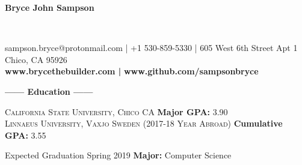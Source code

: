 \documentclass[12pt]{article}
\begin{document}
\sffamily
\lsstyle
\color{white}
\center
\begin{Huge}\textbf{Bryce John Sampson}\end{Huge}\\
\medskip
\fontsize{12}{1.2}
\selectfont
\smallbreak
\colorbox{accent}{
    \parbox{45em}{
        \centering
        \color{secondary}
        sampson.bryce@protonmail.com | +1 530-859-5330 | 605 West 6th Street Apt 1 Chico, CA 95926 \\
        \large
        \textbf{\color{primary}www.brycethebuilder.com |}
        \textbf{\color{primary}www.github.com/sampsonbryce}
    }
}
\smallskip
\center
\textbf{\Large------ Education ------}\\
\flushleft
\begin{footnotesize}
\textsc{California State University, Chico CA}
\hfill
\textbf{\color{primary}Major GPA: }3.90\\

\smallskip
\textsc{Linnaeus University, Vaxjo Sweden (2017-18 Year Abroad)}
\hfill
\textbf{\color{primary}Cumulative GPA: }3.55\\
\smallskip

{\color{accent}Expected Graduation Spring 2019}
\hfill
\textbf{\color{primary}Major: }Computer Science\\
\smallskip

\end{footnotesize}
\end{document}
